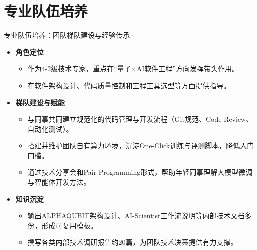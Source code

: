 \documentclass[aspectratio=169]{beamer} %
\begin{document}
\section{专业队伍培养}
\begin{frame}{专业队伍培养：团队梯队建设与经验传承}
    \begin{itemize}
        \item \textbf{角色定位}
        \begin{itemize}
            \item 作为4-2级技术专家，重点在“量子×AI软件工程”方向发挥带头作用。
            \item 在软件架构设计、代码质量控制和工程工具选型等方面提供指导。
        \end{itemize}
        \item \textbf{梯队建设与赋能}
        \begin{itemize}
            \item 与同事共同建立规范化的代码管理与开发流程（Git规范、Code Review、自动化测试）。
            \item 搭建并维护团队自有算力环境，沉淀One-Click训练与评测脚本，降低入门门槛。
            \item 通过技术分享会和Pair-Programming形式，帮助年轻同事理解大模型微调与智能体开发方法。
        \end{itemize}
        \item \textbf{知识沉淀}
        \begin{itemize}
            \item 输出ALPHAQUBIT架构设计、AI-Scientist工作流说明等内部技术文档多份，形成可复用模板。
            \item 撰写各类内部技术调研报告约20篇，为团队技术决策提供有力支撑。
        \end{itemize}
    \end{itemize}
\end{frame}

\end{document}
